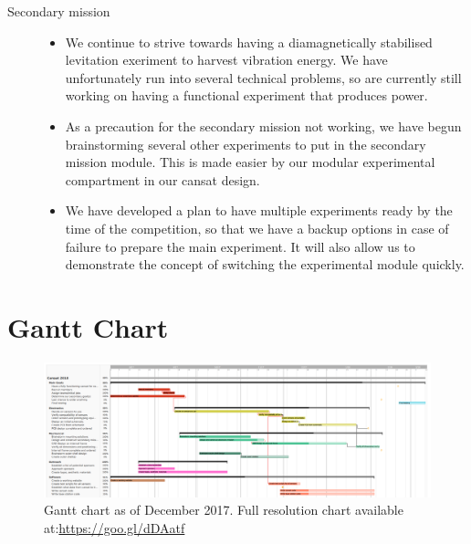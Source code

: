 \documentclass{report}
\begin{document}
\begin{description}
		\item[Secondary mission] \hfill \begin{itemize}
			\item We continue to strive towards having a diamagnetically 
			stabilised levitation exeriment to harvest vibration energy. We have
			unfortunately run into several technical problems, so are currently
			still working on having a functional experiment that produces power.
			\item As a precaution for the secondary mission not working, we 
			have begun brainstorming several other experiments to put in the
			secondary mission module. This is made easier by our modular
			experimental compartment in our cansat design.
			\item We have developed a plan to have multiple experiments ready
			by the time of the competition, so that we have a backup options
			in case of failure to prepare the main experiment. It will also allow
			us to demonstrate the concept of switching the experimental module 
			quickly.
		\end{itemize}

	\end{description}


	\section{Gantt Chart}
	\begin{figure}[h]
	\centering
	\includegraphics[width=\textwidth]{ganttDec.PNG}
	\caption{Gantt chart as of December 2017. Full resolution chart 
	available at:\url{https://goo.gl/dDAatf}}
	\end{figure}
\end{document}
